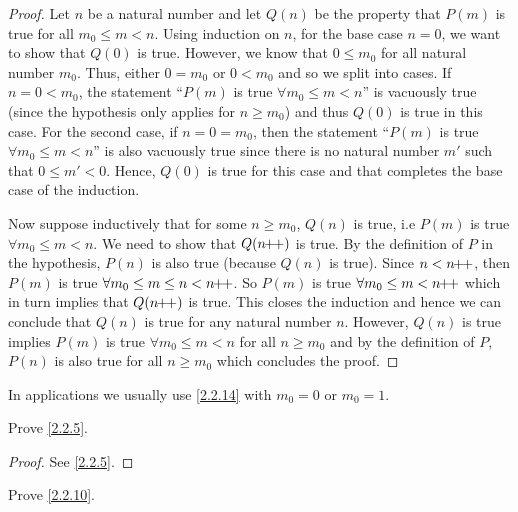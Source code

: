 \begin{proof}
  Let \(n\) be a natural number and let \(Q(n)\) be the property that \(P(m)\) is true for all \(m_0 \leq m < n\).
  Using induction on \(n\), for the base case \(n = 0\), we want to show that \(Q(0)\) is true.
  However, we know that \(0 \leq m_0\) for all natural number \(m_0\).
  Thus, either \(0 = m_0\) or \(0 < m_0\) and so we split into cases.
  If \(n = 0 < m_0\), the statement ``\(P(m)\) is true \(\forall m_0 \leq m < n\)'' is vacuously true (since the hypothesis only applies for \(n \geq m_0\)) and thus \(Q(0)\) is true in this case.
  For the second case, if \(n = 0 = m_0\), then the statement ``\(P(m)\) is true \(\forall m_0 \leq m < n\)'' is also vacuously true since there is no natural number \(m'\) such that \(0 \leq m' < 0\). Hence, \(Q(0)\) is true for this case and that completes the base case of the induction.

  Now suppose inductively that for some \(n \geq m_0\), \(Q(n)\) is true, i.e \(P(m)\) is true \(\forall m_0 \leq m < n\).
  We need to show that \(Q(n\!\!+\!\!+)\) is true.
  By the definition of \(P\) in the hypothesis, \(P(n)\) is also true (because \(Q(n)\) is true).
  Since \(n < n\!\!+\!\!+\), then \(P(m)\) is true \(\forall m_0 \leq m \leq n < n\!\!+\!\!+\).
  So \(P(m)\) is true \(\forall m_0 \leq m < n\!\!+\!\!+\) which in turn implies that \(Q(n\!\!+\!\!+)\) is true.
  This closes the induction and hence we can conclude that \(Q(n)\) is true for any natural number \(n\).
  However, \(Q(n)\) is true implies \(P(m)\) is true \(\forall m_0 \leq m < n\) for all \(n \geq m_0\) and by the definition of \(P\), \(P(n)\) is also true for all \(n \geq m_0\) which concludes the proof.
\end{proof}

\begin{rmk}\label{2.2.15}
  In applications we usually use \cref{2.2.14} with \(m_0 = 0\) or \(m_0 = 1\).
\end{rmk}

\exercisesection

\begin{ex}\label{ex:2.2.1}
  Prove \cref{2.2.5}.
\end{ex}

\begin{proof}
  See \cref{2.2.5}.
\end{proof}

\begin{ex}\label{ex:2.2.2}
  Prove \cref{2.2.10}.
\end{ex}

